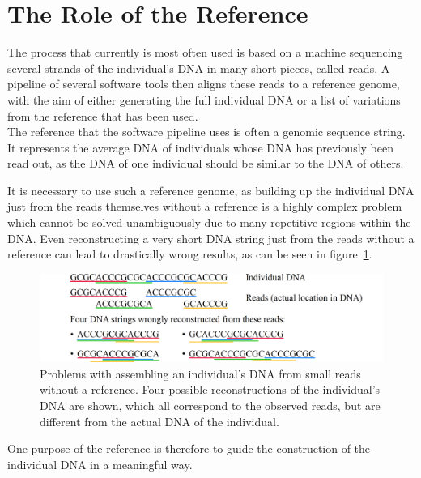 \documentclass[a4paper,12pt,twoside,BCOR=10mm]{scrbook}
\begin{document}
\section{The Role of the Reference}

The process that currently is most often used
is based on a machine sequencing several strands of the
individual's DNA in many short pieces, called reads.
A pipeline of several software tools then aligns these reads to a reference genome,
with the aim of either generating the full individual DNA or a list of variations
from the reference that has been used. \\
The reference that the software pipeline uses is often a genomic sequence string.
It represents the average DNA of individuals whose DNA has previously been read out,
as the DNA of one individual should be similar to the DNA of others.

It is necessary to use such a reference genome, as
building up the individual DNA just from the reads themselves without a reference is a highly complex problem
which cannot be solved unambiguously due to many repetitive regions within the DNA.
Even reconstructing a very short DNA string just from the reads without a reference can lead to drastically wrong
results, as can be seen in figure~\ref{fig:evo_intro_assembly_wo_reference}.
\begin{figure}[!htb]
\centering
\includegraphics[width=\textwidth]{evo_intro_assembly_wo_reference.png}
\caption[Assembling an individual's DNA from small reads without a reference]{Problems with assembling an individual's DNA from small reads without a reference. Four possible reconstructions of the individual's DNA are shown, which all correspond to the observed reads, but are different from the actual DNA of the individual.} \label{fig:evo_intro_assembly_wo_reference}
\end{figure}
One purpose of the reference is therefore to guide the construction of the individual DNA in a meaningful way.
\end{document}
